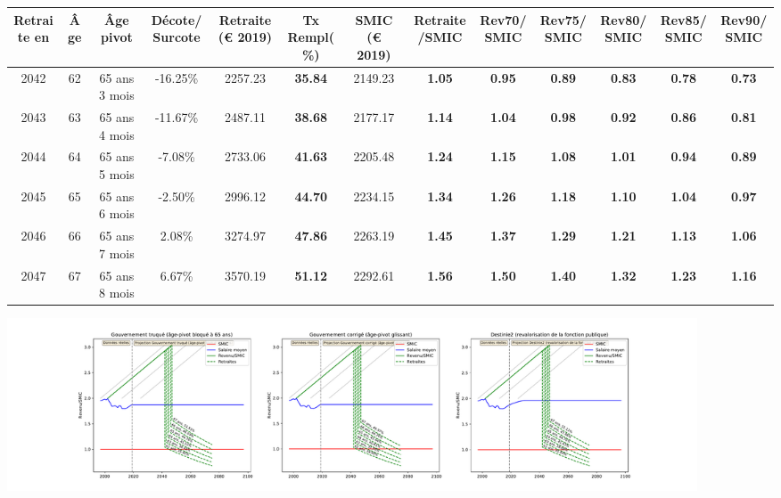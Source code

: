 { \scriptsize \begin{center} 
\begin{tabular}[htb]{|c|c||c|c||c|c||c||c|c|c|c|c|c|} 
\hline 
 Retraite en &  Âge &  Âge pivot &  Décote/Surcote &  Retraite (\euro{} 2019) &  Tx Rempl(\%) &  SMIC (\euro{} 2019) &  Retraite/SMIC &  Rev70/SMIC &  Rev75/SMIC &  Rev80/SMIC &  Rev85/SMIC &  Rev90/SMIC \\ 
\hline \hline 
 2042 &  62 &  65 ans 3 mois &  -16.25\% &  2257.23 &  {\bf 35.84} &  2149.23 &  {\bf 1.05} &  {\bf {\color{red} 0.95}} &  {\bf {\color{red} 0.89}} &  {\bf {\color{red} 0.83}} &  {\bf {\color{red} 0.78}} &  {\bf {\color{red} 0.73}} \\ 
\hline 
 2043 &  63 &  65 ans 4 mois &  -11.67\% &  2487.11 &  {\bf 38.68} &  2177.17 &  {\bf 1.14} &  {\bf 1.04} &  {\bf {\color{red} 0.98}} &  {\bf {\color{red} 0.92}} &  {\bf {\color{red} 0.86}} &  {\bf {\color{red} 0.81}} \\ 
\hline 
 2044 &  64 &  65 ans 5 mois &  -7.08\% &  2733.06 &  {\bf 41.63} &  2205.48 &  {\bf 1.24} &  {\bf 1.15} &  {\bf 1.08} &  {\bf 1.01} &  {\bf {\color{red} 0.94}} &  {\bf {\color{red} 0.89}} \\ 
\hline 
 2045 &  65 &  65 ans 6 mois &  -2.50\% &  2996.12 &  {\bf 44.70} &  2234.15 &  {\bf 1.34} &  {\bf 1.26} &  {\bf 1.18} &  {\bf 1.10} &  {\bf 1.04} &  {\bf {\color{red} 0.97}} \\ 
\hline 
 2046 &  66 &  65 ans 7 mois &  2.08\% &  3274.97 &  {\bf 47.86} &  2263.19 &  {\bf 1.45} &  {\bf 1.37} &  {\bf 1.29} &  {\bf 1.21} &  {\bf 1.13} &  {\bf 1.06} \\ 
\hline 
 2047 &  67 &  65 ans 8 mois &  6.67\% &  3570.19 &  {\bf 51.12} &  2292.61 &  {\bf 1.56} &  {\bf 1.50} &  {\bf 1.40} &  {\bf 1.32} &  {\bf 1.23} &  {\bf 1.16} \\ 
\hline 
\hline 
\end{tabular} 
\end{center} } 

 \begin{center}\includegraphics[width=0.9\textwidth]{fig/Ascendant23_1980_22_dest_retraite.pdf}\end{center} \label{fig/Ascendant23_1980_22_dest_retraite.pdf} 

